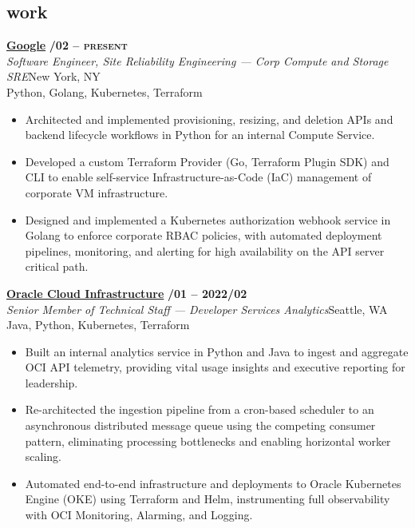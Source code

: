 \documentclass[margin,10pt]{res}
\begin{document}
\begin{resume}
\section{\sc \lsstyle work}
    \href{https://about.google/}{\textbf{Google}} \hfill \textsc{\bfseries{}/02 -- present}\\
    \textit{Software Engineer, Site Reliability Engineering --- Corp Compute and Storage SRE}\hfill New York, NY\\
    Python, Golang, Kubernetes, Terraform
    \begin{itemize}
        \item Architected and implemented provisioning, resizing, and deletion APIs and backend lifecycle workflows in Python for an internal Compute Service.
        \item Developed a custom Terraform Provider (Go, Terraform Plugin SDK) and CLI to enable self-service Infrastructure-as-Code (IaC) management of corporate VM infrastructure.
        \item Designed and implemented a Kubernetes authorization webhook service in Golang to enforce corporate RBAC policies, with automated deployment pipelines, monitoring, and alerting for high availability on the API server critical path.
    \end{itemize}

    \href{https://www.oracle.com/cloud/}{\textbf{Oracle Cloud Infrastructure}} \hfill \textsc{\bfseries{}/01 -- 2022/02}\\
    \textit{Senior Member of Technical Staff --- Developer Services Analytics}\hfill Seattle, WA\\
    Java, Python, Kubernetes, Terraform
    \begin{itemize}
        \item Built an internal analytics service in Python and Java to ingest and aggregate OCI API telemetry, providing vital usage insights and executive reporting for leadership.
        \item Re-architected the ingestion pipeline from a cron-based scheduler to an asynchronous distributed message queue using the competing consumer pattern, eliminating processing bottlenecks and enabling horizontal worker scaling.
        \item Automated end-to-end infrastructure and deployments to Oracle Kubernetes Engine (OKE) using Terraform and Helm, instrumenting full observability with OCI Monitoring, Alarming, and Logging.
    \end{itemize}


\end{resume}
\end{document}
